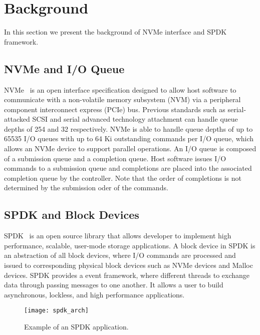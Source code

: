 \section{Background}

In this section we present the background of NVMe interface and SPDK 
framework.

\subsection{NVMe and I/O Queue}

NVMe~\cite{nvme} is an open interface specification designed to allow host
software to communicate with a non-volatile memory subsystem (NVM) via a 
peripheral component interconnect express (PCIe) bus. Previous standards
such as serial-attacked SCSI and serial advanced technology attachment
can handle queue depths of 254 and 32 respectively. NVMe is able to 
handle queue depths of up to 65535 I/O queues with up to 64 Ki outstanding
commands per I/O queue, which allows an NVMe device to support parallel
operations. An I/O queue is composed of a submission queue and a completion
queue. Host software issues I/O commands to a submission queue and completions
are placed into the associated completion queue by the controller. Note that
the order of completions is not determined by the submission oder of the commands.

\subsection{SPDK and Block Devices}

SPDK~\cite{spdk} is an open source library that allows developer to implement
high performance, scalable, user-mode storage applications. A block device 
in SPDK is an abstraction of all block devices, where I/O commands are 
processed and issued to corresponding physical block devices such as NVMe 
devices and Malloc devices. SPDK provides a event framework, where  
different threads to exchange data through passing messages to one another.
It allows a user to build asynchronous, lockless, and high performance
applications.

\begin{figure}[t]
  \texttt{[image: spdk\_arch]}
  \caption{Example of an SPDK application.}
  \label{fig:spdk_arch}
\end{figure}

